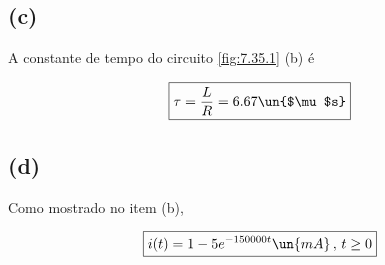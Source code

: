 \subsection*{(c)}

A constante de tempo do circuito \ref*{fig:7.35.1} (b) é  

\[ \boxed{\tau = \frac{L}{R} = 6.67 \un{$\mu$s}}  \]

\subsection*{(d)}

Como mostrado no item (b),   

\[ \boxed{i(t) = 1 - 5e^{- 150000t} \un{mA} \, , \, t \geq 0}  \]
























